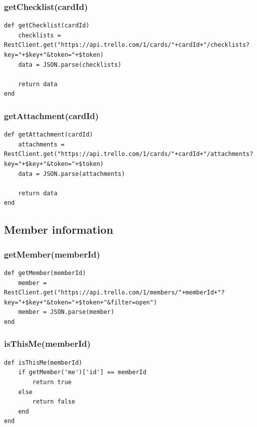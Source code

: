 \subsubsection{getChecklist(cardId)}
\begin{lstlisting}[aboveskip=1\baselineskip, caption= getChecklist(), label=listing056]
def getChecklist(cardId)
	checklists = RestClient.get("https://api.trello.com/1/cards/"+cardId+"/checklists?key="+$key+"&token="+$token)
	data = JSON.parse(checklists)

	return data  
end
\end{lstlisting}

\subsubsection{getAttachment(cardId)}
\begin{lstlisting}[aboveskip=1\baselineskip, caption= getAttachment(), label=listing057]
def getAttachment(cardId)
	attachments = RestClient.get("https://api.trello.com/1/cards/"+cardId+"/attachments?key="+$key+"&token="+$token)
	data = JSON.parse(attachments)

	return data
end
\end{lstlisting}


\subsection{Member information}

\subsubsection{getMember(memberId)}
\begin{lstlisting}[aboveskip=1\baselineskip, caption= getMember(), label=listing058]
def getMember(memberId)
	member = RestClient.get("https://api.trello.com/1/members/"+memberId+"?key="+$key+"&token="+$token+"&filter=open")
	member = JSON.parse(member)
end
\end{lstlisting}

\subsubsection{isThisMe(memberId)}
\begin{lstlisting}[aboveskip=1\baselineskip, caption= isThisMe(), label=listing059]
def isThisMe(memberId)
	if getMember('me')['id'] == memberId
		return true
	else
		return false
	end
end
\end{lstlisting}

